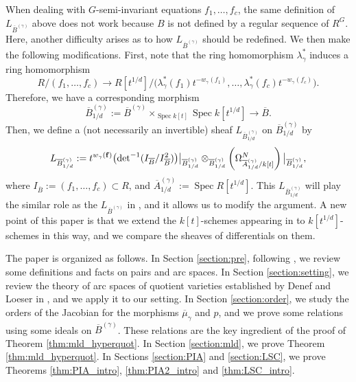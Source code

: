 \documentclass[a4paper,11pt]{amsart}
\theoremstyle{definition}
\theoremstyle{remark}
\begin{document}
When dealing with $G$-semi-invariant equations $f_1, \ldots, f_c$, the same definition of $L_{\overline{B}^{(\gamma)}}$ above does not work because $B$ is not defined by a regular sequence of $R^G$. Here, another difficulty arises as to how $L_{\overline{B}^{(\gamma)}}$ should be redefined.
We then make the following modifications. 
First, note that the ring homomorphism $\lambda ^*_{\gamma}$ induces a ring homomorphism
\[
R/(f_1, \ldots, f_c) \longrightarrow 
R[t^{1/d}]/\bigl( \lambda ^* _{\gamma}(f_1)t^{-w_\gamma(f_1)}, \ldots , \lambda ^* _{\gamma}(f_c)t^{-w_\gamma(f_c)} \bigr). 
\]
Therefore, we have a corresponding morphism
\[
\overline{B}^{(\gamma)}_{1/d} := \overline{B}^{(\gamma)}\times_{\operatorname{Spec} k[t]} \operatorname{Spec} k[t^{1/d}] 
\longrightarrow \overline{B}. 
\]
Then, we define a (not necessarily an invertible) sheaf $L_{\overline{B}^{(\gamma)}_{1/d}}$ on $\overline{B}^{(\gamma)}_{1/d}$ by 
\[
L_{\overline{B}^{(\gamma)}_{1/d}} := 
t^{w_{\gamma}({\bf f})}
\bigl( \operatorname{det}^{-1} (I_{\overline{B}}/I_{\overline{B}}^2) \bigr) \big|_{\overline{B}^{(\gamma)}_{1/d}}
\otimes _{\overline{B}^{(\gamma)}_{1/d}} 
\left( \Omega _{\overline{A}^{(\gamma)}_{1/d} /k[t]} ^N \right) \big|_{\overline{B}^{(\gamma)}_{1/d}}, 
\]
where $I_{\overline{B}} := \left( f_1, \ldots , f_c \right) \subset R$, 
and $\overline{A}^{(\gamma)}_{1/d} := \operatorname{Spec} R[t^{1/d}]$. 
This $L_{\overline{B}^{(\gamma)}_{1/d}}$ will play the similar role as the $L_{\overline{B}^{(\gamma)}}$ in \cite{NS22}, and it allows us to modify the argument. 
A new point of this paper is that we extend the $k[t]$-schemes appearing in \cite{NS22} to $k[t^{1/d}]$-schemes in this way, and we compare the sheaves of differentials on them. 

The paper is organized as follows. 
In Section \ref{section:pre}, following \cite{NS22}, we review some definitions and facts on pairs and arc spaces. 
In Section \ref{section:setting}, we review the theory of arc spaces of quotient varieties established by Denef and Loeser in \cite{DL02}, and we apply it to our setting. 
In Section \ref{section:order}, we study the orders of the Jacobian for the morphisms $\overline{\mu} _{\gamma}$ and $p$, and we prove some relations using some ideals on $\overline{B}^{(\gamma)}$. 
These relations are the key ingredient of the proof of Theorem \ref{thm:mld_hyperquot}.  
In Section \ref{section:mld}, we prove Theorem \ref{thm:mld_hyperquot}.
In Sections \ref{section:PIA} and \ref{section:LSC}, we prove Theorems \ref{thm:PIA_intro},  \ref{thm:PIA2_intro} and \ref{thm:LSC_intro}.
\end{document}
